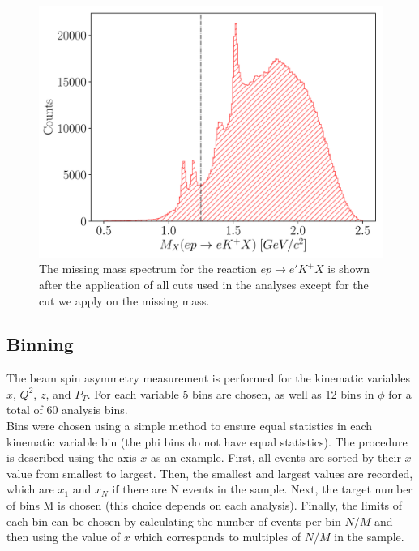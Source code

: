 
\begin{figure}
	\centering
	\includegraphics[width=16cm]{image/plots/kaon-bsa/mx.pdf}
	\caption{The missing mass spectrum for the reaction $ep \rightarrow e'K^+X$ is shown after the application of all cuts used in the analyses except for the cut we apply on the missing mass.}
\end{figure}

\subsection{Binning}

The beam spin asymmetry measurement is performed for the kinematic variables $x$, $Q^2$, $z$, and $P_T$.  For each variable 5 bins are chosen, as well as 12 bins in $\phi$ for a total of 60 analysis bins. \\

Bins were chosen using a simple method to ensure equal statistics in each kinematic variable bin (the phi bins do not have equal statistics).  The procedure is described using the axis $x$ as an example.  First, all events are sorted by their $x$ value from smallest to largest.  Then, the smallest and largest values are recorded, which are $x_1$ and $x_N$ if there are N events in the sample.  Next, the target number of bins M is chosen (this choice depends on each analysis).  Finally, the limits of each bin can be chosen by calculating the number of events per bin $N/M$ and then using the value of $x$ which corresponds to multiples of $N/M$ in the sample.    


